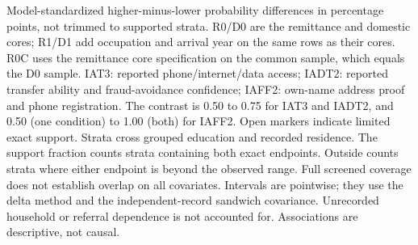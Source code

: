 Model-standardized higher-minus-lower probability differences in percentage points, not trimmed to supported strata. R0/D0 are the remittance and domestic cores; R1/D1 add occupation and arrival year on the same rows as their cores. R0C uses the remittance core specification on the common sample, which equals the D0 sample. IAT3: reported phone/internet/data access; IADT2: reported transfer ability and fraud-avoidance confidence; IAFF2: own-name address proof and phone registration. The contrast is 0.50 to 0.75 for IAT3 and IADT2, and 0.50 (one condition) to 1.00 (both) for IAFF2. Open markers indicate limited exact support. Strata cross grouped education and recorded residence. The support fraction counts strata containing both exact endpoints. Outside counts strata where either endpoint is beyond the observed range. Full screened coverage does not establish overlap on all covariates. Intervals are pointwise; they use the delta method and the independent-record sandwich covariance. Unrecorded household or referral dependence is not accounted for. Associations are descriptive, not causal.
